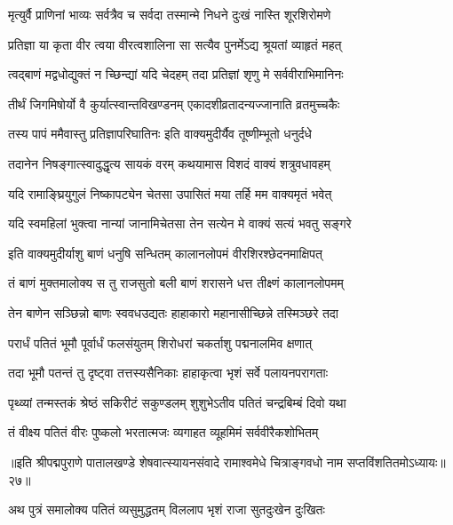 \twolineshloka
{मृत्युर्वै प्राणिनां भाव्यः सर्वत्रैव च सर्वदा}
{तस्मान्मे निधने दुःखं नास्ति शूरशिरोमणे}%

\twolineshloka
{प्रतिज्ञा या कृता वीर त्वया वीरत्वशालिना}
{सा सत्यैव पुनर्मेऽद्य श्रूयतां व्याहृतं महत्}%

\twolineshloka
{त्वद्बाणं मद्वधोद्युक्तं न च्छिन्द्यां यदि चेदहम्}
{तदा प्रतिज्ञां शृणु मे सर्ववीराभिमानिनः}%

\twolineshloka
{तीर्थं जिगमिषोर्यो वै कुर्यात्स्वान्तविखण्डनम्}
{एकादशीव्रतादन्यज्जानाति व्रतमुच्चकैः}%

\twolineshloka
{तस्य पापं ममैवास्तु प्रतिज्ञापरिघातिनः}
{इति वाक्यमुदीर्यैव तूष्णीम्भूतो धनुर्दधे}%

\twolineshloka
{तदानेन निषङ्गात्स्वादुद्धृत्य सायकं वरम्}
{कथयामास विशदं वाक्यं शत्रुवधावहम्}%


\twolineshloka
{यदि रामाङ्घ्रियुगुलं निष्कापट्येन चेतसा}
{उपासितं मया तर्हि मम वाक्यमृतं भवेत्}%

\twolineshloka
{यदि स्वमहिलां भुक्त्वा नान्यां जानामिचेतसा}
{तेन सत्येन मे वाक्यं सत्यं भवतु सङ्गरे}%

\twolineshloka
{इति वाक्यमुदीर्याशु बाणं धनुषि सन्धितम्}
{कालानलोपमं वीरशिरश्छेदनमाक्षिपत्}%

\twolineshloka
{तं बाणं मुक्तमालोक्य स तु राजसुतो बली}
{बाणं शरासने धत्त तीक्ष्णं कालानलोपमम्}%

\twolineshloka
{तेन बाणेन सञ्छिन्नो बाणः स्ववधउद्यतः}
{हाहाकारो महानासीच्छिन्ने तस्मिञ्छरे तदा}%

\twolineshloka
{परार्धं पतितं भूमौ पूर्वार्धं फलसंयुतम्}
{शिरोधरां चकर्ताशु पद्मनालमिव क्षणात्}%

\twolineshloka
{तदा भूमौ पतन्तं तु दृष्ट्वा तत्तस्यसैनिकाः}
{हाहाकृत्वा भृशं सर्वे पलायनपरागताः}%

\twolineshloka
{पृथ्व्यां तन्मस्तकं श्रेष्ठं सकिरीटं सकुण्डलम्}
{शुशुभेऽतीव पतितं चन्द्रबिम्बं दिवो यथा}%

\twolineshloka
{तं वीक्ष्य पतितं वीरः पुष्कलो भरतात्मजः}
{व्यगाहत व्यूहमिमं सर्ववीरैकशोभितम्}%

{॥इति श्रीपद्मपुराणे पातालखण्डे शेषवात्स्यायनसंवादे रामाश्वमेधे चित्राङ्गवधो नाम सप्तविंशतितमोऽध्यायः॥२७॥}

\resetShloka


\twolineshloka
{अथ पुत्रं समालोक्य पतितं व्यसुमुद्धतम्}
{विललाप भृशं राजा सुतदुःखेन दुःखितः}%

